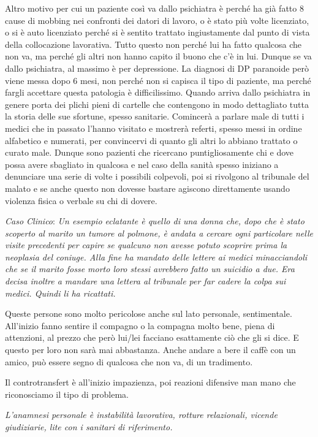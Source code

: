 \documentclass[]{article}
\begin{document}
Altro motivo per cui un paziente così va dallo psichiatra è perché ha
già fatto 8 cause di mobbing nei confronti dei datori di lavoro, o è
stato più volte licenziato, o si è auto licenziato perché si è sentito
trattato ingiustamente dal punto di vista della collocazione lavorativa.
Tutto questo non perché lui ha fatto qualcosa che non va, ma perché gli
altri non hanno capito il buono che c'è in lui. Dunque se va dallo
psichiatra, al massimo è per depressione. La diagnosi di DP paranoide
però viene messa dopo 6 mesi, non perché non si capisca il tipo di
paziente, ma perché fargli accettare questa patologia è difficilissimo.
Quando arriva dallo psichiatra in genere porta dei plichi pieni di
cartelle che contengono in modo dettagliato tutta la storia delle sue
sfortune, spesso sanitarie. Comincerà a parlare male di tutti i medici
che in passato l'hanno visitato e mostrerà referti, spesso messi in
ordine alfabetico e numerati, per convincervi di quanto gli altri lo
abbiano trattato o curato male. Dunque sono pazienti che ricercano
puntigliosamente chi e dove possa avere sbagliato in qualcosa e nel caso
della sanità spesso iniziano a denunciare una serie di volte i possibili
colpevoli, poi si rivolgono al tribunale del malato e se anche questo
non dovesse bastare agiscono direttamente usando violenza fisica o
verbale su chi di dovere.

\emph{Caso Clinico}: \emph{Un esempio eclatante è quello di una donna
che, dopo che è stato scoperto al marito un tumore al polmone, è andata
a cercare ogni particolare nelle visite precedenti per capire se
qualcuno non avesse potuto scoprire prima la neoplasia del coniuge. Alla
fine ha mandato delle lettere ai medici minacciandoli che se il marito
fosse morto loro stessi avrebbero fatto un suicidio a due. Era decisa
inoltre a mandare una lettera al tribunale per far cadere la colpa sui
medici. Quindi li ha ricattati.}

Queste persone sono molto pericolose anche sul lato personale,
sentimentale. All'inizio fanno sentire il compagno o la compagna molto
bene, piena di attenzioni, al prezzo che però lui/lei facciano
esattamente ciò che gli si dice. E questo per loro non sarà mai
abbastanza. Anche andare a bere il caffè con un amico, può essere segno
di qualcosa che non va, di un tradimento.

Il controtransfert è all'inizio impazienza, poi reazioni difensive man
mano che riconosciamo il tipo di problema.

\emph{\emph{L'anamnesi personale è instabilità lavorativa, rotture
relazionali, vicende giudiziarie, lite con i sanitari di riferimento. }}
\end{document}

